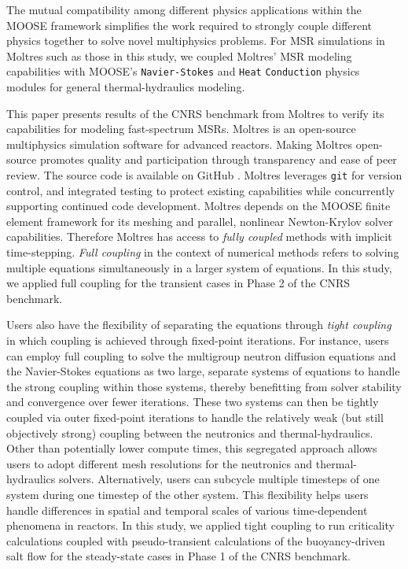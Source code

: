 The mutual compatibility among different physics applications within the
\gls{MOOSE} framework simplifies the work required to strongly couple
different physics together to solve novel multiphysics problems. For \gls{MSR}
simulations in Moltres such as those in this study, we coupled Moltres'
\gls{MSR} modeling capabilities with \gls{MOOSE}'s \texttt{Navier-Stokes} and
\texttt{Heat} \texttt{Conduction} physics modules \cite{peterson_overview_2018}
for general thermal-hydraulics modeling.

This paper presents results of the CNRS benchmark from Moltres
to verify its capabilities for modeling fast-spectrum \glspl{MSR}. Moltres
is an open-source multiphysics simulation software for advanced reactors.
Making Moltres open-source promotes quality and participation through
transparency and ease of peer review. The source code
\cite{lindsay_moltres_2017} is available on GitHub \cite{github_build_2017}.
Moltres leverages \texttt{git} for version control, and integrated testing to
protect existing capabilities while concurrently supporting continued code
development. Moltres depends on the \gls{MOOSE} finite element framework for
its meshing and parallel, nonlinear Newton-Krylov solver capabilities.
Therefore Moltres has access to \textit{fully coupled} methods with implicit
time-stepping. \textit{Full coupling} in the context of numerical methods
refers to solving multiple equations simultaneously in a larger system of
equations. In this study, we applied full coupling for the transient
cases in Phase 2 of the CNRS benchmark.

Users also have the flexibility of separating the equations through
\textit{tight coupling} in which coupling is achieved through
fixed-point iterations. For instance, users can employ full coupling to solve
the multigroup neutron diffusion equations and the Navier-Stokes equations as
two large, separate systems of equations to handle the strong coupling within
those systems, thereby benefitting from solver stability and convergence
over fewer iterations. These two systems can then be tightly coupled via outer
fixed-point iterations to handle the relatively weak (but still objectively
strong) coupling between the neutronics and thermal-hydraulics. Other than
potentially lower compute times, this segregated approach allows users to adopt
different mesh resolutions for the neutronics and thermal-hydraulics solvers.
Alternatively, users can subcycle multiple timesteps of one system during one
timestep of the other system. This flexibility helps users handle differences
in spatial and temporal scales of various
time-dependent phenomena in reactors. In this study, we applied tight coupling
to run criticality calculations coupled with pseudo-transient calculations of
the buoyancy-driven salt flow for the steady-state cases in Phase 1 of the CNRS
benchmark.

